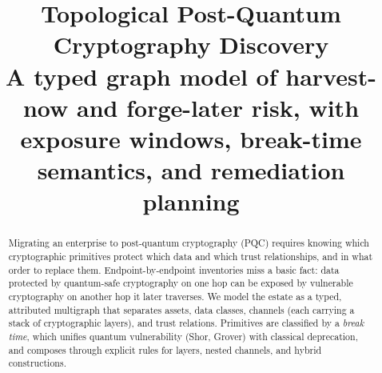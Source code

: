 \documentclass[conference]{IEEEtran}
\begin{document}
\title{Topological Post-Quantum Cryptography Discovery\\[4pt]\large A typed graph model of harvest-now and forge-later risk, with exposure windows, break-time semantics, and remediation planning}
\author{
}
\maketitle
\begin{abstract}
Migrating an enterprise to post-quantum cryptography (PQC) requires knowing which cryptographic primitives protect which data and which trust relationships, and in what order to replace them. Endpoint-by-endpoint inventories miss a basic fact: data protected by quantum-safe cryptography on one hop can be exposed by vulnerable cryptography on another hop it later traverses. We model the estate as a typed, attributed multigraph that separates assets, data classes, channels (each carrying a stack of cryptographic layers), and trust relations. Primitives are classified by a \emph{break time}, which unifies quantum vulnerability (Shor, Grover) with classical deprecation, and composes through explicit rules for layers, nested channels, and hybrid constructions.


\end{abstract}
\end{document}
